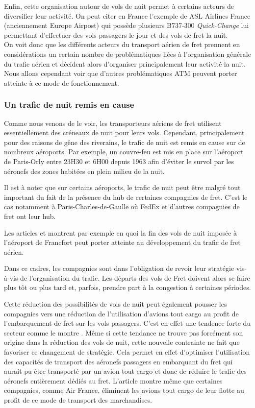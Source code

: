 Enfin, cette organisation autour de vols de nuit permet à certains acteurs de diversifier leur activité. On peut citer en France l'exemple de ASL Airlines France (anciennement Europe Airpost) qui possède plusieurs B737-300 \textit{Quick-Change} lui permettant d'effectuer des vols passagers le jour et des vols de fret la nuit.\\

On voit donc que les différents acteurs du transport aérien de fret prennent en considérations un certain nombre de problématiques liées à l'organisation générale du trafic aérien et décident alors d'organiser principalement leur activité la nuit. Nous allons cependant voir que d'autres problématiques ATM peuvent porter atteinte à ce mode de fonctionnement.

\subsubsection{Un trafic de nuit remis en cause}

Comme nous venons de le voir, les transporteurs aériens de fret utilisent essentiellement des créneaux de nuit pour leurs vols. Cependant, principalement pour des raisons de gêne des riverains, le trafic de nuit est remis en cause sur de nombreux aéroports. Par exemple, un couvre-feu est mis en place sur l'aéroport de Paris-Orly entre 23H30 et 6H00 depuis 1963 afin d'éviter le survol par les aéronefs des zones habitées en plein milieu de la nuit.

Il est à noter que sur certains aéroports, le trafic de nuit peut être malgré tout important du fait de la présence du hub de certaines compagnies de fret. C'est le cas notamment à Paris-Charles-de-Gaulle où FedEx et d'autres compagnies de fret ont leur hub. 

Les articles \cite{boutelet_2012} et \cite{garric_2012} montrent par exemple en quoi la fin des vols de nuit imposée à l'aéroport de Francfort peut porter atteinte au développement du trafic de fret aérien.

Dans ce cadres, les compagnies sont dans l'obligation de revoir leur stratégie vis-à-vis de l'organisation du trafic. Les départs des vols de Fret doivent alors se faire plus tôt ou plus tard et, parfois, prendre part à la congestion à certaines périodes.

Cette réduction des possibilités de vols de nuit peut également pousser les compagnies vers une réduction de l'utilisation d'avions tout cargo au profit de l'embarquement de fret sur les vols passagers. C'est en effet une tendence forte du secteur comme le montre \cite{RePEc:eee:jaitra:v:61:y:2017:i:c:p:34-40}. Même si cette tendance ne trouve pas forcément son origine dans la réduction des vols de nuit, cette nouvelle contrainte ne fait que favoriser ce changement de stratégie. Cela permet en effet d'optimiser l'utilisation des capacités de transport des aéronefs passagers en embarquant du fret qui aurait pu être transporté par un avion tout cargo et donc de réduire le trafic des aéronefs entièrement dédiés au fret. L'article montre même que certaines compagnies, comme Air France, éliminent les avions tout cargo de leur flotte au profit de ce mode de transport des marchandises.

